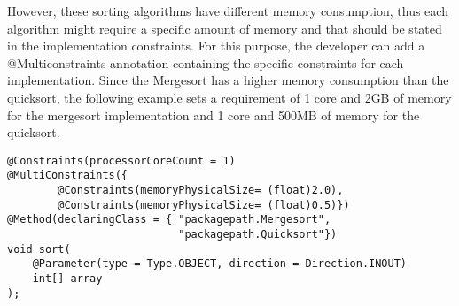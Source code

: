 However, these sorting algorithms have different memory consumption, thus each algorithm might require a
specific amount of memory and that should be stated in the implementation constraints. For this purpose, the
developer can add a @Multiconstraints annotation containing the specific constraints for each
implementation. Since the Mergesort has a higher memory consumption than the quicksort, the following
example sets a requirement of 1 core and 2GB of memory for the mergesort implementation and 1 core and
500MB of memory for the quicksort.

\begin{lstlisting}
@Constraints(processorCoreCount = 1)
@MultiConstraints({
        @Constraints(memoryPhysicalSize= (float)2.0),
        @Constraints(memoryPhysicalSize= (float)0.5)})
@Method(declaringClass = { "packagepath.Mergesort",
                           "packagepath.Quicksort"})
void sort(
    @Parameter(type = Type.OBJECT, direction = Direction.INOUT)
    int[] array
);
\end{lstlisting}